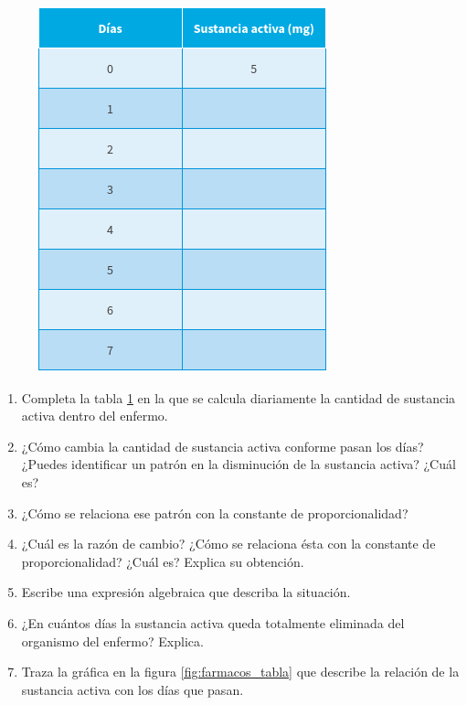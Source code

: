 \documentclass[11pt]{book}
\begin{document}
\begin{enumerate}
        \begin{figure}[H]
          \centering
          \includegraphics[width=0.75\linewidth]{farmacos}
          \label{tab:farmacos}
        \end{figure}%
        \begin{enumerate}
          \item Completa la tabla \ref{tab:farmacos} en la que se calcula diariamente la cantidad de sustancia activa dentro del enfermo.
          \item ¿Cómo cambia la cantidad de sustancia activa conforme pasan los días? ¿Puedes identificar un patrón en la disminución de la sustancia activa? ¿Cuál es?
          \item ¿Cómo se relaciona ese patrón con la constante de proporcionalidad?
          \item ¿Cuál es la razón de cambio? ¿Cómo se relaciona ésta con la constante de proporcionalidad? ¿Cuál es? Explica su obtención.
          \item Escribe una expresión algebraica que describa la situación.
          \item ¿En cuántos días la sustancia activa queda totalmente eliminada del organismo del enfermo? Explica.
          \item Traza la gráfica en la figura \ref{fig:farmacos_tabla} que describe la relación de la sustancia activa con los días que pasan.

\end{enumerate}
\end{enumerate}
\end{document}

